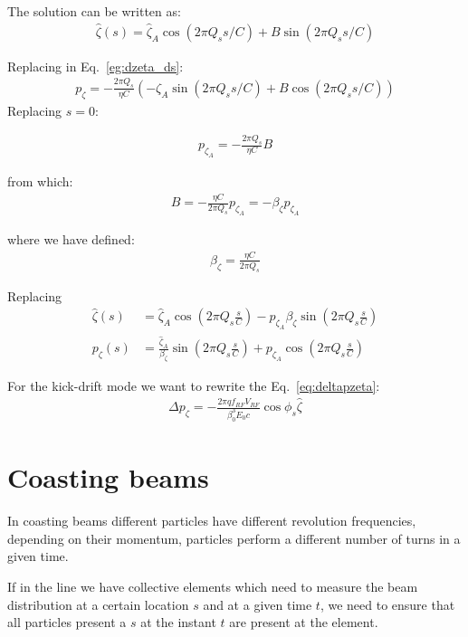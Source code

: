 The solution can be written as:
\begin{align}
\hat{\zeta}(s) = \hat{\zeta}_A \cos\left( 2 \pi Q_s s/C\right) + B \sin\left( 2 \pi Q_s s/C \right)
\end{align}

Replacing in Eq.~\ref{eg:dzeta_ds}:
\begin{align}
p_\zeta = - \frac{2\pi Q_s} {\eta C} \left( -\zeta_A \sin\left( 2 \pi Q_s s/C\right) + B \cos\left( 2 \pi Q_s s/C \right)\right)
\end{align}
Replacing $s=0$:

\begin{align}
p_{\zeta_A} = - \frac{2\pi Q_s} {\eta C} B
\end{align}

from which:
\begin{align}
B = -\frac{\eta C}{2\pi Q_s}p_{\zeta_A} = -\beta_\zeta p_{\zeta_A}
\end{align}

where we have defined:
\begin{align}
\beta_\zeta = \frac{\eta C}{2\pi Q_s}
\end{align}

Replacing
\begin{align}
\hat{\zeta}(s) &= \hat{\zeta}_A \cos\left( 2 \pi Q_s \frac{s}{C}\right) -p_{\zeta_A} \beta_\zeta \sin\left( 2 \pi Q_s \frac{s}{C} \right)\\
p_\zeta(s) &= \frac{\hat{\zeta}_A}{\beta_\zeta} \sin\left( 2 \pi Q_s \frac{s}{C}\right)
           + p_{\zeta_A} \cos\left( 2 \pi Q_s \frac{s}{C}\right)
\end{align}

For the kick-drift mode we want to rewrite the Eq.~\ref{eq:deltapzeta}:
\begin{align}
\Delta {p}_\zeta =-\frac{2\pi q f_{RF} V_{RF}}{\beta_0^3 E_0 c}\cos{\phi_s}\hat{\zeta}
\end{align}

\section{Coasting beams}

In coasting beams different particles have different revolution frequencies, depending on their momentum, particles perform a different number of turns in a given time. 

If in the line we have collective elements which need to measure the beam distribution at a certain location $s$ and at a given time $t$, we need to ensure that all particles present a $s$ at the instant $t$ are present at the element.

